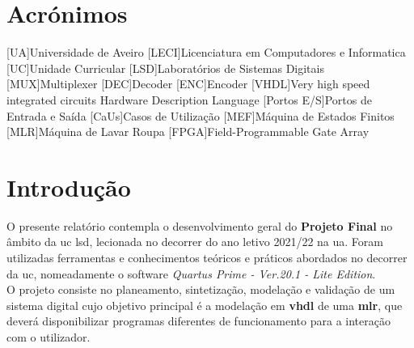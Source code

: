 
 
	
	
	
	
	

\renewcommand{\contentsname}{Conteúdos}
\tableofcontents
\listoffigures
{}


\chapter*{Acrónimos}
\begin{acronym}

[UA]{Universidade de Aveiro}
[LECI]{Licenciatura em Computadores e Informatica}
[UC]{Unidade Curricular}
[LSD]{Laboratórios de Sistemas Digitais}
[MUX]{Multiplexer}
[DEC]{Decoder}
[ENC]{Encoder}
[VHDL]{Very high speed integrated circuits Hardware Description Language}
[Portos E/S]{Portos de Entrada e Saída}
[CaUs]{Casos de Utilização}
[MEF]{Máquina de Estados Finitos}
[MLR]{Máquina de Lavar Roupa}
[FPGA]{Field-Programmable Gate Array}

\end{acronym}


\pagestyle{fancy}
\fancyhf{}
\rhead{\titulo}
\cfoot{\thepage}



\chapter*{Introdução}
\label{chap.Intro}
\begin{multicols}{2}

O presente relatório contempla o desenvolvimento geral do \textbf{Projeto Final} no âmbito da \ac{uc} \ac{lsd}, lecionada no decorrer do ano letivo 2021/22 na \ac{ua}. Foram utilizadas ferramentas e conhecimentos teóricos e práticos abordados no decorrer da \ac{uc}, nomeadamente o software \textit{Quartus Prime - Ver.20.1 - Lite Edition}. \\
O projeto consiste no planeamento, sintetização, modelação e validação de um sistema digital cujo objetivo principal é a modelação em \textbf{\ac{vhdl}} de uma \textbf{\ac{mlr}}, que deverá disponibilizar programas diferentes de funcionamento para a interação com o utilizador. \\

\end{multicols}

